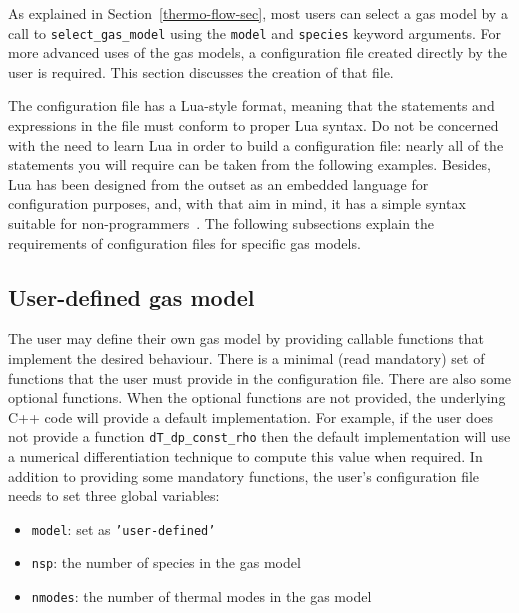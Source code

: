 As explained in Section~\ref{thermo-flow-sec}, most users
can select a gas model by a call to \texttt{select\_gas\_model}
using the \texttt{model} and \texttt{species} keyword arguments.
For more advanced uses of the gas models, a configuration file
created directly by the user is required.
This section discusses the creation of that file.

The configuration file has a Lua-style format, meaning
that the statements and expressions in the file must conform
to proper Lua syntax.
Do not be concerned with the need to learn Lua in order to
build a configuration file: nearly all of the statements
you will require can be taken from the following examples.
Besides, Lua has been designed from the outset as an embedded
language for configuration purposes, and, with that aim in mind,
it has a simple syntax suitable for non-programmers~\cite{ierusalimschy_etal_1996}.
The following subsections explain the requirements of configuration
files for specific gas models.

\subsection{User-defined gas model}
The user may define their own gas model by providing
callable functions that implement the desired behaviour.
There is a minimal (read mandatory) set of functions
that the user must provide in the configuration file.
There are also some optional functions.
When the optional functions are not provided, the
underlying C++ code will provide a default implementation.
For example, if the user does not provide a function \texttt{dT\_dp\_const\_rho}
then the default implementation will use a numerical differentiation
technique to compute this value when required.
In addition to providing some mandatory functions, the user's
configuration file needs to set three global variables:
\begin{itemize}
 \item \texttt{model}: set as \texttt{'user-defined'}
 \item \texttt{nsp}: the number of species in the gas model
 \item \texttt{nmodes}: the number of thermal modes in the gas model
\end{itemize}

